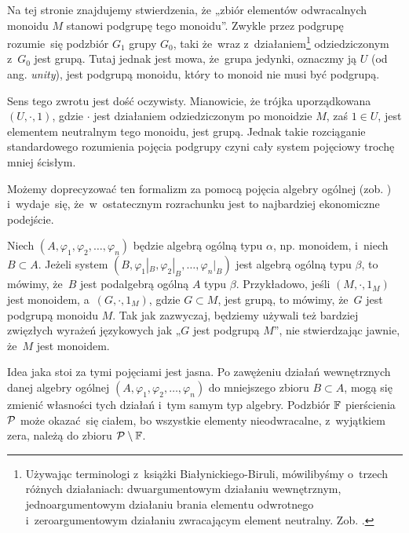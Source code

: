 \documentclass[a4paper,11pt]{article}
\begin{document}
\vspace{\spaceFour}





\start {} Na tej stronie znajdujemy stwierdzenia, że „zbiór
elementów odwracalnych monoidu $M$ stanowi podgrupę tego monoidu”.
Zwykle przez podgrupę rozumie~się podzbiór $G_{ 1 }$ grupy $G_{ 0 }$,
taki że~wraz z~działaniem\footnote{Używając terminologi z~książki
  Białynickiego-Biruli, mówilibyśmy o~trzech różnych działaniach:
  dwuargumentowym działaniu wewnętrznym, jednoargumentowym działaniu brania
  elementu odwrotnego i~zeroargumentowym działaniu zwracającym element
  neutralny. Zob. \cite{BialynickiBirulaZarysAlgebry1987}.} odziedziczonym
z~$G_{ 0 }$ jest grupą. Tutaj
jednak jest mowa, że~grupa jedynki, oznaczmy ją $U$ (od ang.
\textit{unity}), jest podgrupą monoidu, który to monoid nie musi być
podgrupą.

Sens tego zwrotu jest dość oczywisty. Mianowicie, że trójka uporządkowana
$( U, \cdot, 1 )$, gdzie $\cdot$ jest działaniem odziedziczonym po
monoidzie $M$, zaś $1 \in U$, jest elementem neutralnym tego monoidu,
jest grupą. Jednak takie rozciąganie standardowego rozumienia pojęcia podgrupy czyni cały system pojęciowy trochę mniej ścisłym.

Możemy doprecyzować ten formalizm za pomocą pojęcia algebry
ogólnej (zob. \cite{BialynickiBirulaZarysAlgebry1987}) i~wydaje~się, że~w~ostatecznym rozrachunku jest to najbardziej ekonomiczne podejście.

Niech $( A, \varphi_{ 1 }, \varphi_{ 2 }, \ldots, \varphi_{ n } )$ będzie algebrą ogólną typu $\alpha$, np.
monoidem, i~niech $B \subset A$. Jeżeli system
$( B, \varphi_{ 1 }|_{ B }, \varphi_{ 2 }|_{ B }, \ldots, \varphi_{ n }|_{ B } )$ jest algebrą ogólną
typu $\beta$, to mówimy, że~$B$ jest podalgebrą ogólną $A$ typu $\beta$.
Przykładowo, jeśli $( M, \cdot, 1_{ M } )$ jest monoidem, a~$( G, \cdot, 1_{ M } )$,
gdzie $G \subset M$, jest grupą, to mówimy, że~$G$ jest podgrupą monoidu $M$. Tak
jak zazwyczaj, będziemy używali też bardziej zwięzłych wyrażeń językowych
jak „$G$ jest podgrupą $M$”, nie stwierdzając jawnie, że~$M$ jest monoidem.

Idea jaka stoi za tymi pojęciami jest jasna. Po zawężeniu działań
wewnętrznych danej algebry ogólnej $( A, \varphi_{ 1 }, \varphi_{ 2 }, \ldots, \varphi_{ n } )$ do
mniejszego zbioru $B \subset A$, mogą się zmienić własności tych działań i~tym
samym typ algebry. Podzbiór $\mathbb{F}$ pierścienia $\mathcal{P}$ może okazać~się
ciałem, bo wszystkie elementy nieodwracalne, z~wyjątkiem zera, należą do
zbioru $\mathcal{P} \setminus \mathbb{F}$.
\end{document}
